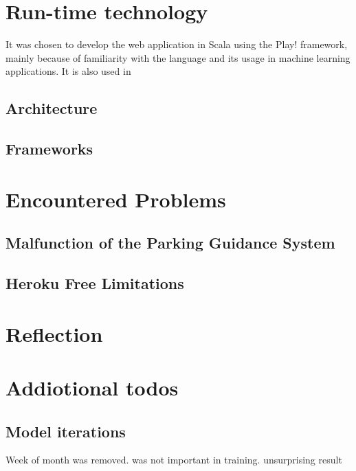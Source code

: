 \section{Run-time technology}

It was chosen to develop the web application in Scala using the Play! framework, mainly because of familiarity with the language and its usage in machine learning applications. It is also used in  

\subsection{Architecture}\label{sec:architecture}


\subsection{Frameworks}\label{sec:frameworks}


\section{Encountered Problems}\label{sec:challenges}
\subsection{Malfunction of the Parking Guidance System}


\subsection{Heroku Free Limitations}




\section{Reflection}


\section{Addiotional todos}
\subsection{Model iterations}

Week of month was removed. was not important in training. unsurprising result
